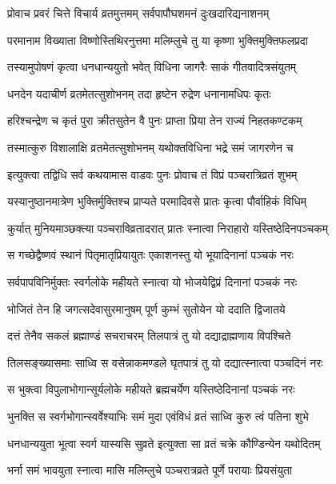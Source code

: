 \twolineshloka
{प्रोवाच प्रवरं चित्ते विचार्य व्रतमुत्तमम्}
{सर्वपापौघशमनं दुःखदारिद्यनाशनम्} %

\twolineshloka
{परमानाम विख्याता विष्णोस्तिथिरनुत्तमा}
{मलिम्लुचे तु या कृष्णा भुक्तिमुक्तिफलप्रदा} %

\twolineshloka
{तस्यामुपोषणं कृत्वा धनधान्ययुतो भवेत्}
{विधिना जागरैः साकं गीतवादित्रसंयुतम्} %

\twolineshloka
{धनदेन यदाचीर्ण व्रतमेतत्सुशोभनम्}
{तदा हृष्टेन रुद्रेण धनानामधिपः कृतः} %

\twolineshloka
{हरिश्चन्द्रेण च कृतं पुरा क्रीतसुतेन वै}
{पुनः प्राप्ता प्रिया तेन राज्यं निहतकण्टकम्} %

\twolineshloka
{तस्मात्कुरु विशालाक्षि व्रतमेतत्सुशोभनम्}
{यथोक्तविधिना भद्रे समं जागरणेन च} %

\twolineshloka
{इत्युक्त्वा तद्विधि सर्व कथयामास वाडवः}
{पुनः प्रोवाच तं विप्रं पञ्चरात्रिव्रतं शुभम्} %

\twolineshloka
{यस्यानुष्ठानमात्रेण भुक्तिर्मुक्तिश्च प्राप्यते}
{परमादिवसे प्रातः कृत्वा पौर्वाहिकं विधिम्} %

\twolineshloka
{कुर्यात् मुनियमाञ्छक्त्या पञ्चराविव्रतादरात्}
{प्रातः स्नात्वा निराहारो यस्तिष्ठेदिनपञ्चकम्} %

\twolineshloka
{स गच्छेद्वैष्णवं स्थानं पितृमातृप्रियायुतः}
{एकाशनस्तु यो भूयादिनानां पञ्चकं नरः} %

\twolineshloka
{सर्वपापविनिर्मुक्तः स्वर्गलोके महीयते}
{स्नात्वा यो भोजयेद्विप्रं दिनानां पञ्चकं नरः} %

\twolineshloka
{भोजितं तेन हि जगत्सदेवासुरमानुषम्}
{पूर्ण कुम्भं सुतोयेन यो ददाति द्विजातये} %

\twolineshloka
{दत्तं तेनैव सकलं ब्रह्माण्डं सचराचरम्}
{तिलपात्रं तु यो दद्याद्राह्मणाय विपश्चिते} %

\twolineshloka
{तिलसङ्ख्यासमाः साध्वि स वसेन्नाकमण्डले}
{घृतपात्रं तु यो दद्यात्स्नात्वा पञ्चदिनं नरः} %

\twolineshloka
{स भुक्त्वा विपुलाभोगान्सूर्यलोके महीयते}
{ब्रह्मचर्येण यस्तिष्ठेदिनानां पञ्चकं नरः} %

\twolineshloka
{भुनक्ति स स्वर्गभोगान्स्वर्वेश्याभिः समं मुदा}
{एवंविधं व्रतं साध्वि कुरु त्वं पतिना शुभे} %

\twolineshloka
{धनधान्ययुता भूत्वा स्वर्ग यास्यसि सुव्रते}
{इत्युक्ता सा व्रतं चक्रे कौण्डिन्येन यथोदितम्} %

\twolineshloka
{भर्ना समं भावयुता स्नात्वा मासि मलिम्लुचे}
{पञ्चरात्रव्रते पूर्णे परायाः प्रियसंयुता} %

